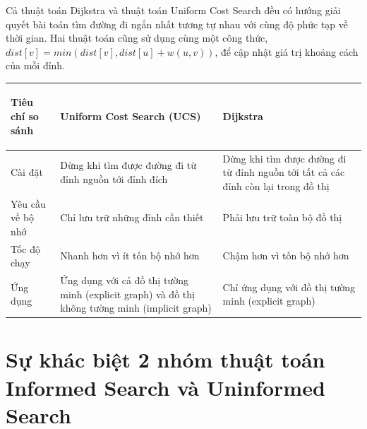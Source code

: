 \hspace{0.42cm} Cả thuật toán Dijkstra và thuật toán Uniform Cost Search đều có hướng giải quyết bài toán tìm đường đi ngắn nhất tương tự nhau với cùng độ phức tạp về thời gian. Hai thuật toán cũng sử dụng cùng một công thức, $dist[v] = min(dist[v], dist[u] + w(u, v))$, để cập nhật giá trị khoảng cách của mỗi đỉnh.
\begin{center}
    \begin{tabular}{ |m{3cm}|m{6cm}|m{6cm}|}
    \hline
    \rowcolor[RGB]{229,229,229} 
    \begin{center}\textbf{Tiêu chí so sánh}\end{center} & \begin{center}\textbf{Uniform Cost Search (UCS)}\end{center} & \begin{center}\textbf{Dijkstra}\end{center}  \\ \hline
    \centering Cài đặt & Dừng khi tìm được đường đi từ đỉnh nguồn tới đỉnh đích & Dừng khi tìm được đường đi từ đỉnh nguồn tới tất cả các đỉnh còn lại trong đồ thị  \\ \hline
    \centering Yêu cầu về bộ nhớ & Chỉ lưu trữ những đỉnh cần thiết & Phải lưu trữ toàn bộ đồ thị \\ \hline
    \centering Tốc độ chạy & Nhanh hơn vì ít tốn bộ nhớ hơn & Chậm hơn vì tốn bộ nhớ hơn  \\ \hline
    \centering Ứng dụng & Ứng dụng với cả đồ thị tường minh (explicit graph) và đồ thị không tường minh (implicit graph) & Chỉ ứng dụng với đồ thị tường minh (explicit graph) \\ \hline
    \end{tabular}
\end{center}

\section{Sự khác biệt 2 nhóm thuật toán Informed Search và Uninformed Search}

